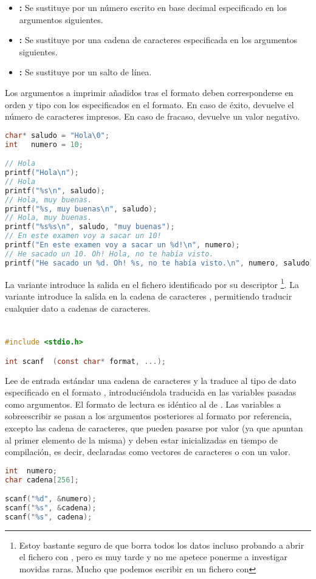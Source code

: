\begin{itemize}
	\item{}\textbf{:} Se sustituye por un número escrito en base decimal especificado en los argumentos siguientes.
	\item{}\textbf{:} Se sustituye por una cadena de caracteres especificada en los argumentos siguientes.
	\item{}\textbf{:} Se sustituye por un salto de línea.
\end{itemize}

Los argumentos a imprimir añadidos tras el formato deben corresponderse en orden y tipo con los especificados en el formato.
En caso de éxito, devuelve el número de caracteres impresos.
En caso de fracaso, devuelve un valor negativo.

\begin{lstlisting}[language=C]
char* saludo = "Hola\0";
int   numero = 10;

// Hola
printf("Hola\n");
// Hola
printf("%s\n", saludo);
// Hola, muy buenas.
printf("%s, muy buenas\n", saludo);
// Hola, muy buenas.
printf("%s%s\n", saludo, "muy buenas");
// En este examen voy a sacar un 10!
printf("En este examen voy a sacar un %d!\n", numero);
// He sacado un 10. Oh! Hola, no te había visto.
printf("He sacado un %d. Oh! %s, no te había visto.\n", numero, saludo);
\end{lstlisting}

La variante  introduce la salida en el fichero identificado por su descriptor \footnote{Estoy bastante seguro de que borra todos los datos incluso probando a abrir el fichero con , pero es muy tarde y no me apetece ponerme a investigar movidas raras. Mucho que podemos escribir en un fichero con }.
La variante  introduce la salida en la cadena de caracteres , permitiendo traducir cualquier dato a cadenas de caracteres.

\section{}

\begin{lstlisting}[language=C]
#include <stdio.h>

int scanf  (const char* format, ...);
\end{lstlisting}

Lee de entrada estándar una cadena de caracteres y la traduce al tipo de dato especificado en el formato , introduciéndola traducida en las variables pasadas como argumentos.
El formato de lectura es idéntico al de .
Las variables a sobreescribir se pasan a los argumentos posteriores al formato por referencia, excepto las cadena de caracteres, que pueden pasarse por valor (ya que apuntan al primer elemento de la misma) y deben estar inicializadas en tiempo de compilación, es decir, declaradas como vectores de caracteres o con un valor.

\begin{lstlisting}[language=C]
int  numero;
char cadena[256];

scanf("%d", &numero);
scanf("%s", &cadena);
scanf("%s", cadena);
\end{lstlisting}


